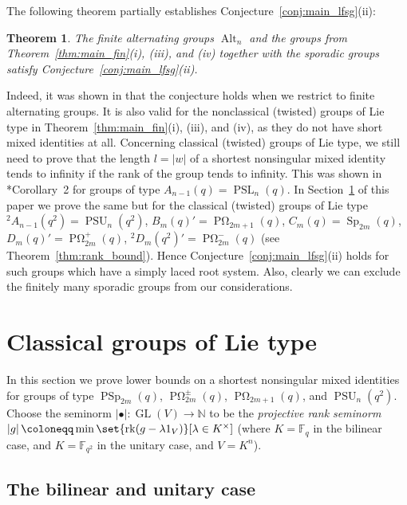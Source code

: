 \documentclass[a4paper,12pt]{amsproc}
\newcommand{\norm}[1]{\left\lvert#1\right\rvert}%
\DeclareMathOperator{\GL}{GL}%
\DeclareMathOperator{\rk}{rk}%
\DeclareMathOperator{\Sp}{Sp}%
\DeclareMathOperator{\PSU}{PSU}%
\DeclareMathOperator{\PSL}{PSL}%
\DeclareMathOperator{\PSp}{PSp}%
\DeclareMathOperator{\POmega}{P\Omega}%
\DeclareMathOperator{\Alt}{Alt}%
\theoremstyle{plain}
\newtheorem{theorem}[definition]{Theorem}
\theoremstyle{definition}
\begin{document}
The following theorem partially establishes Conjecture~\ref{conj:main_lfsg}(ii):

\begin{theorem}\label{thm:part_conj_jones}
The finite alternating groups $\Alt_n$ and the groups from Theorem~\ref{thm:main_fin}(i), (iii), and (iv) together with the sporadic groups satisfy Conjecture~\ref{conj:main_lfsg}(ii). 
\end{theorem}

Indeed, it was shown in \cite{schneiderthom2022word} that the conjecture holds when we restrict to finite alternating groups. It is also valid for the nonclassical (twisted) groups of Lie type in Theorem~\ref{thm:main_fin}(i), (iii), and (iv), as they do not have short mixed identities at all. Concerning classical (twisted) groups of Lie type, we still need to prove that the length $l=\norm{w}$ of a shortest nonsingular mixed identity tends to infinity if the rank of the group tends to infinity. This was shown in \cite{bradfordschneiderthom2023non}*{Corollary~2} for groups of type $A_{n-1}(q)=\PSL_n(q)$. In Section~\ref{sec:classical_grps_of_lie_type} of this paper we prove the same but for the classical (twisted) groups of Lie type ${}^2A_{n-1}(q^2)=\PSU_n(q^2)$, $B_m(q)'=\POmega_{2m+1}(q)$, $C_m(q)=\Sp_{2m}(q)$, $D_m(q)'=\POmega_{2m}^+(q)$, ${}^2D_m(q^2)'=\POmega_{2m}^-(q)$ (see Theorem~\ref{thm:rank_bound}). Hence Conjecture~\ref{conj:main_lfsg}(ii) holds for such groups which have a simply laced root system. Also, clearly we can exclude the finitely many sporadic groups from our considerations. 



\section{Classical groups of Lie type}\label{sec:classical_grps_of_lie_type}

In this section we prove lower bounds on a shortest nonsingular mixed identities for groups of type $\PSp_{2m}(q)$, $\POmega_{2m}^{\pm}(q)$, $\POmega_{2m+1}(q)$, and $\PSU_n(q^2)$. Choose the seminorm $\norm{\bullet}\colon \GL(V)\to\mathbb{N}$ to be the \emph{projective rank seminorm} $\norm{g}\coloneqq\min\set{\rk(g-\lambda 1_V)}[\lambda\in K^\times]$ (where $K=\mathbb{F}_q$ in the bilinear case, and $K=\mathbb{F}_{q^2}$ in the unitary case, and $V=K^n$). 

\subsection{The bilinear and unitary case}
\end{document}
